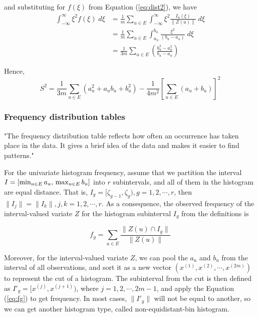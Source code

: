 \documentclass[article]{jss}
\begin{document}
and substituting for $f(\xi)$ from Equation (\ref{eq:dist2}), we have 
\begin{equation}\label{eq:derived}
\begin{split}
\int_{-\infty}^{\infty} \xi^2f(\xi)\;d\xi &= \frac{1}{m}\sum_{u \in E}\int_{-\infty}^{\infty} \xi^2 \frac{I_u(\xi)}{\| Z(u) \|}\;d\xi \\
&= \frac{1}{m}\sum_{u \in E} \int_{a_u}^{b_u} \frac{\xi^2}{(b_u-a_u)}\;d\xi \\
&= \frac{1}{3m} \sum_{u \in E}(\frac{b_u^3 - a_u^3}{b_u-a_u})
\end{split}
\end{equation}

Hence,
\begin{equation}\label{eq:var}
S^2 = \frac{1}{3m} \sum_{u \in E}(a_u^2+a_ub_u+b_u^2)-\frac{1}{4m^2}\left[ \sum_{u \in E}(a_u+b_u) \right]^2
\end{equation}



\subsubsection{Frequency distribution tables}\label{sec:hist}
"The frequency distribution table reflects how often an occurrence has taken place in the data. It gives a brief idea of the data and makes it easier to find patterns."

For the univariate histogram frequency, assume that we partition the interval $I=[\min_{u \in E} a_u,\\ \max_{u \in E} b_u]$ into $r$ subintervals, and all of them in the histogram are equal distance. That is, $I_g = [\zeta_{g-1},\zeta_{g}),g=1,2,\cdots,r$, then $\| I_j \| = \| I_k \| , j,k=1,2,\cdots,r$. As a consequence, the observed frequency of the interval-valued variate $Z$ for the histogram subinterval $I_g$ from the definitions is

\begin{equation}\label{eq:fg}
f_g = \sum_{u \in E}\frac{\| Z(u) \cap I_g \|}{\| Z(u) \|}
\end{equation}

Moreover, for the interval-valued variate $Z$, we can pool the $a_u$ and $b_u$ from the interval of all observations, and sort it as a new vector $(x^{(1)},x^{(2)}, \cdots, x^{(2m)})$ to represent the cut of a histogram. The subinterval from the cut is then defined as $I'_g = [x^{(j)},x^{(j+1)})$, where $j = 1,2,\cdots, 2m-1$, and apply the Equation (\ref{eq:fg}) to get frequency. In most cases, $\| I'_g \|$ will not be equal to another, so we can get another histogram type, called non-equidistant-bin histogram.
\end{document}
